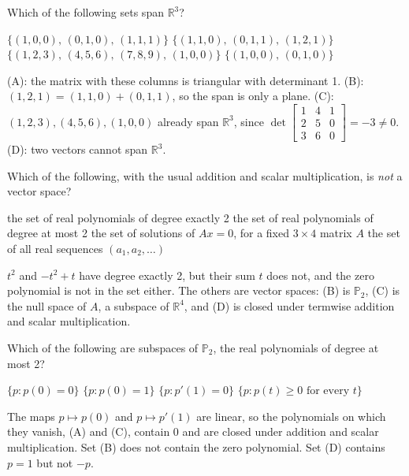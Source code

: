 \begin{question}[id=vs-9, type=msq, marks=2]
Which of the following sets span $\mathbb{R}^3$?
\begin{options}
  \correct $\{(1, 0, 0),\, (0, 1, 0),\, (1, 1, 1)\}$
  \option $\{(1, 1, 0),\, (0, 1, 1),\, (1, 2, 1)\}$
  \correct $\{(1, 2, 3),\, (4, 5, 6),\, (7, 8, 9),\, (1, 0, 0)\}$
  \option $\{(1, 0, 0),\, (0, 1, 0)\}$
\end{options}
\begin{solution}
(A): the matrix with these columns is triangular with determinant 1. (B): $(1, 2, 1) = (1, 1, 0) + (0, 1, 1)$, so the span is only a plane. (C): $(1, 2, 3), (4, 5, 6), (1, 0, 0)$ already span $\mathbb{R}^3$, since $\det \begin{bmatrix} 1 & 4 & 1 \\ 2 & 5 & 0 \\ 3 & 6 & 0 \end{bmatrix} = -3 \ne 0$. (D): two vectors cannot span $\mathbb{R}^3$.
\end{solution}
\end{question}

\begin{question}[id=vs-10]
Which of the following, with the usual addition and scalar multiplication, is \emph{not} a vector space?
\begin{options}
  \correct the set of real polynomials of degree exactly 2
  \option the set of real polynomials of degree at most 2
  \option the set of solutions of $Ax = 0$, for a fixed $3 \times 4$ matrix $A$
  \option the set of all real sequences $(a_1, a_2, \dots)$
\end{options}
\begin{solution}
$t^2$ and $-t^2 + t$ have degree exactly 2, but their sum $t$ does not, and the zero polynomial is not in the set either. The others are vector spaces: (B) is $\mathbb{P}_2$, (C) is the null space of $A$, a subspace of $\mathbb{R}^4$, and (D) is closed under termwise addition and scalar multiplication.
\end{solution}
\end{question}

\begin{question}[id=vs-11, type=msq, marks=2]
Which of the following are subspaces of $\mathbb{P}_2$, the real polynomials of degree at most 2?
\begin{options}
  \correct $\{p : p(0) = 0\}$
  \option $\{p : p(0) = 1\}$
  \correct $\{p : p'(1) = 0\}$
  \option $\{p : p(t) \ge 0 \text{ for every } t\}$
\end{options}
\begin{solution}
The maps $p \mapsto p(0)$ and $p \mapsto p'(1)$ are linear, so the polynomials on which they vanish, (A) and (C), contain 0 and are closed under addition and scalar multiplication. Set (B) does not contain the zero polynomial. Set (D) contains $p = 1$ but not $-p$.
\end{solution}
\end{question}


